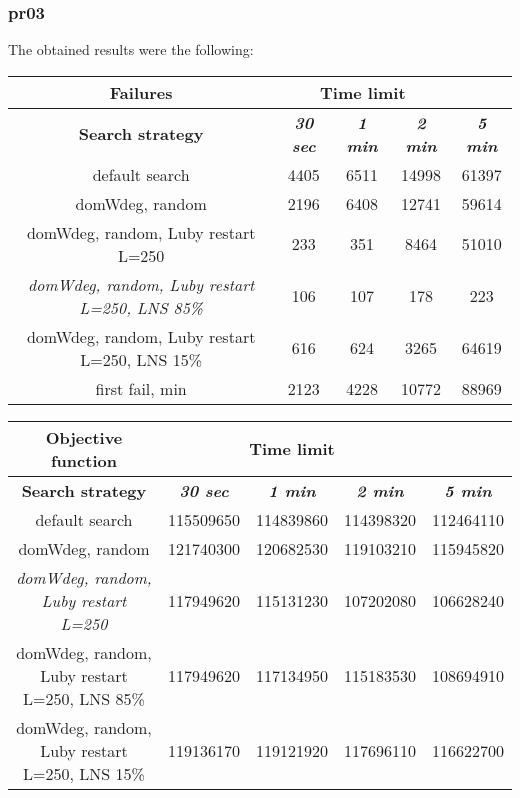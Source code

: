 \subsubsection{pr03}
The obtained results were the following:
{
\renewcommand{\arraystretch}{2}
\begin{longtable}[h]{| c | c | c | c | c |}
    \hline
    \textbf{Failures} & \multicolumn{3}{c}{Time limit} & \\
    \hline
    \textbf{Search strategy} & \textbf{\textit{30 sec}} & \textbf{\textit{1 min}} & \textbf{\textit{2 min}} & \textbf{\textit{5 min}} \\
    \hline
    \endhead
    default search                                         &  4405 &  6511 & 14998 &  61397 \\
    \hline
    domWdeg, random                                        &  2196 &  6408 & 12741 &  59614 \\
    \hline
    domWdeg, random, Luby restart L=250                    &   233 &   351 &  8464 &  51010 \\
    \hline
    \textit{domWdeg, random, Luby restart L=250, LNS 85\%} &   106 &   107 &   178 &    223 \\
    \hline
    domWdeg, random, Luby restart L=250, LNS 15\%          &   616 &   624 &  3265 &  64619 \\
    \hline
    first fail, min                                        &  2123 &  4228 & 10772 &  88969 \\
    \hline
\end{longtable}
}

{
\renewcommand{\arraystretch}{2}
\begin{longtable}[h]{| c | c | c | c | c |}
    \hline
    \textbf{Objective function} & \multicolumn{3}{c}{Time limit} & \\
    \hline
    \textbf{Search strategy} & \textbf{\textit{30 sec}} & \textbf{\textit{1 min}} & \textbf{\textit{2 min}} & \textbf{\textit{5 min}} \\
    \hline
    \endhead
    default search                                & 115509650 & 114839860 & 114398320 & 112464110 \\
    \hline
    domWdeg, random                               & 121740300 & 120682530 & 119103210 & 115945820 \\
    \hline
    \textit{domWdeg, random, Luby restart L=250}  & 117949620 & 115131230 & 107202080 & 106628240 \\
    \hline
    domWdeg, random, Luby restart L=250, LNS 85\% & 117949620 & 117134950 & 115183530 & 108694910 \\
    \hline
    domWdeg, random, Luby restart L=250, LNS 15\% & 119136170 & 119121920 & 117696110 & 116622700 \\
    \hline
\end{longtable}
}